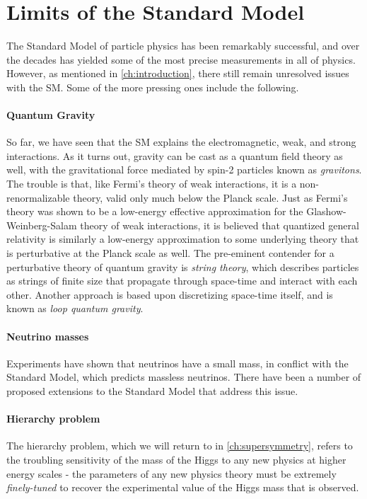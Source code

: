 \section{Limits of the Standard Model}
The Standard Model of particle physics has been remarkably successful, and over the decades has yielded some of the most precise measurements in all of physics. However, as mentioned in \autoref{ch:introduction}, there still remain unresolved issues with the SM. Some of the more pressing ones include the following.

\paragraph{Quantum Gravity} So far, we have seen that the SM explains the electromagnetic, weak, and strong interactions. As it turns out, gravity can be cast as a quantum field theory as well, with the gravitational force mediated by spin-2 particles known as \emph{gravitons}. The trouble is that, like Fermi's theory of weak interactions, it is a non-renormalizable theory, valid only much below the Planck scale. Just as Fermi's theory was shown to be a low-energy effective approximation for the Glashow-Weinberg-Salam theory of weak interactions, it is believed that quantized general relativity is similarly a low-energy approximation to some underlying theory that is perturbative at the Planck scale as well. The pre-eminent contender for a perturbative theory of quantum gravity is \emph{string theory}, which describes particles as strings of finite size that propagate through space-time and interact with each other. Another approach is based upon discretizing space-time itself, and is known as \emph{loop quantum gravity}.

\paragraph{Neutrino masses} Experiments have shown that neutrinos have a small mass, in conflict with the Standard Model, which predicts massless neutrinos. There have been a number of proposed extensions to the Standard Model that address this issue.
\paragraph{Hierarchy problem}
The hierarchy problem, which we will return to in \autoref{ch:supersymmetry},  refers to the troubling sensitivity of the mass of the Higgs to any new physics at higher energy scales - the parameters of any new physics theory must be extremely \emph{finely-tuned} to recover the experimental value of the Higgs mass that is observed.

